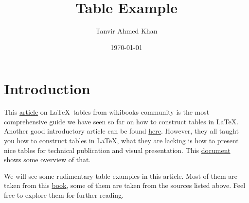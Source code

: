 \documentclass{article}
\title{Table Example}
\author{Tanvir Ahmed Khan}
\date{\today}
\begin{document}
\maketitle

\section{Introduction}
%
This \href{http://en.wikibooks.org/wiki/LaTeX/Tables}{article} on \LaTeX\ tables from wikibooks community is the most comprehensive guide we have seen so far on how to construct tables in \LaTeX. Another good introductory article can be found \href{https://www.sharelatex.com/learn/Tables}{here}. However, they all taught you how to construct tables in \LaTeX, what they are lacking is how to present nice tables for technical publication and visual presentation. This \href{http://www.inf.ethz.ch/personal/markusp/teaching/guides/guide-tables.pdf}{document} shows some overview of that.

We will see some rudimentary table examples in this article. Most of them are taken from this \href{http://dragonbook.stanford.edu/}{book}, some of them are taken from the sources listed above. Feel free to explore them for further reading.
\end{document}
